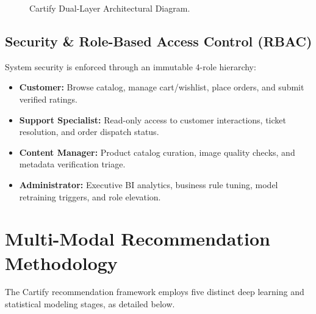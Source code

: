 \documentclass[conference]{IEEEtran}
\begin{document}
\begin{figure}[htbp]
\centering
{}
\caption{Cartify Dual-Layer Architectural Diagram.}
\label{fig:architecture}
\end{figure}

\subsection{Security \& Role-Based Access Control (RBAC)}
System security is enforced through an immutable 4-role hierarchy:
\begin{itemize}
    \item \textbf{Customer:} Browse catalog, manage cart/wishlist, place orders, and submit verified ratings.
    \item \textbf{Support Specialist:} Read-only access to customer interactions, ticket resolution, and order dispatch status.
    \item \textbf{Content Manager:} Product catalog curation, image quality checks, and metadata verification triage.
    \item \textbf{Administrator:} Executive BI analytics, business rule tuning, model retraining triggers, and role elevation.
\end{itemize}

\section{Multi-Modal Recommendation Methodology}
The Cartify recommendation framework employs five distinct deep learning and statistical modeling stages, as detailed below.
\end{document}
